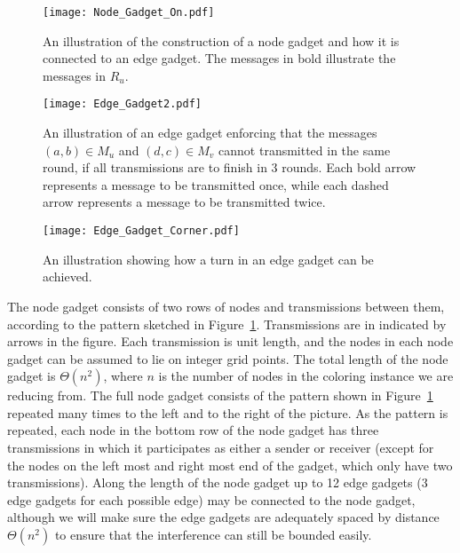 \documentclass{article}
\begin{document}
\begin{figure}
\begin{center}
\texttt{[image: Node\_Gadget\_On.pdf]}
\end{center}
\caption[Node gadget]{An illustration of the construction of a node gadget and how it is connected to an edge gadget.  The messages in bold illustrate the messages in $R_u$.}
\label{fig:nodegadgeton}
\end{figure}
\begin{figure}
\begin{center}
\texttt{[image: Edge\_Gadget2.pdf]}
\end{center}
\caption[Edge gadget]{An illustration of an edge gadget enforcing that the messages $(a,b) \in M_u$ and $(d,c) \in M_v$ cannot transmitted in the same round, if all transmissions are to finish in 3 rounds. Each bold arrow represents a message to be transmitted once, while each dashed arrow represents a message to be transmitted twice.}
\label{fig:edgegadget}
\end{figure}
\begin{figure}[t!]
\begin{center}
\texttt{[image: Edge\_Gadget\_Corner.pdf]}
\end{center}
\caption[Edge gadget]{An illustration showing how a turn in an edge gadget can be achieved.}
\label{fig:edgeturn}
\end{figure}

The node gadget consists of two rows of nodes and transmissions between them, according to the pattern sketched in Figure~\ref{fig:nodegadgeton}.  Transmissions are in indicated by arrows in the figure.  Each transmission is unit length, and the nodes in each node gadget can be assumed to lie on integer grid points. The total length of the node gadget is $\Theta( n^2 )$, where $n$ is the number of nodes in the coloring instance we are reducing from.  The full node gadget consists of the pattern shown in Figure~\ref{fig:nodegadgeton} repeated many times to the left and to the right of the picture.  As the pattern is repeated, each node in the bottom row of the node gadget has three transmissions in which it participates as either a sender or receiver (except for the nodes on the left most and right most end of the gadget, which only have two transmissions).  Along the length of the node gadget up to 12 edge gadgets (3 edge gadgets for each possible edge) may be connected to the node gadget, although we will make sure the edge gadgets are adequately spaced by distance $\Theta( n^2 )$ to ensure that the interference can still be bounded easily.
\end{document}
